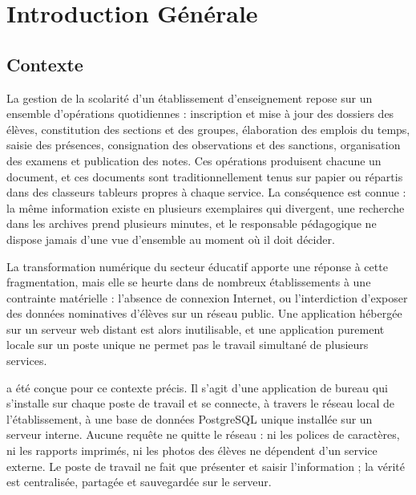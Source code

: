 \chapter*{Introduction Générale}

\section*{Contexte}
La gestion de la scolarité d'un établissement d'enseignement repose sur un ensemble d'opérations
quotidiennes : inscription et mise à jour des dossiers des élèves, constitution des sections et des
groupes, élaboration des emplois du temps, saisie des présences, consignation des observations et des
sanctions, organisation des examens et publication des notes. Ces opérations produisent chacune un
document, et ces documents sont traditionnellement tenus sur papier ou répartis dans des classeurs
tableurs propres à chaque service. La conséquence est connue : la même information existe en plusieurs
exemplaires qui divergent, une recherche dans les archives prend plusieurs minutes, et le responsable
pédagogique ne dispose jamais d'une vue d'ensemble au moment où il doit décider.

La transformation numérique du secteur éducatif apporte une réponse à cette fragmentation, mais elle se
heurte dans de nombreux établissements à une contrainte matérielle : l'absence de connexion Internet,
ou l'interdiction d'exposer des données nominatives d'élèves sur un réseau public. Une application
hébergée sur un serveur web distant est alors inutilisable, et une application purement locale sur un
poste unique ne permet pas le travail simultané de plusieurs services.

\textbf{\appname} a été conçue pour ce contexte précis. Il s'agit d'une application de bureau qui
s'installe sur chaque poste de travail et se connecte, à travers le réseau local de l'établissement, à
une base de données PostgreSQL unique installée sur un serveur interne. Aucune requête ne quitte le
réseau : ni les polices de caractères, ni les rapports imprimés, ni les photos des élèves ne dépendent
d'un service externe. Le poste de travail ne fait que présenter et saisir l'information ; la vérité est
centralisée, partagée et sauvegardée sur le serveur.

